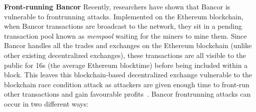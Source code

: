 \par\noindent\textbf{Front-running Bancor} Recently, researchers have shown that Bancor is vulnerable to frontrunning attacks. Implemented on the Ethereum blockchain, when Bancor transactions are broadcast to the network, they sit in a pending transaction pool known as \textit{mempool} waiting for the miners to mine them. Since Bancor handles all the trades and exchanges on the Ethereum blockchain (unlike other existing decentralized exchanges), these transactions are all visible to the public for 16s (the average Ethereum blocktime) before being included within a block. This leaves this blockchain-based decentralized exchange vulnerable to the blockchain race condition attack as attackers are given enough time to front-run other transactions and gain favourable profits~\cite{BancorIs7:online}. Bancor frontrunning attacks can occur in two different ways:



